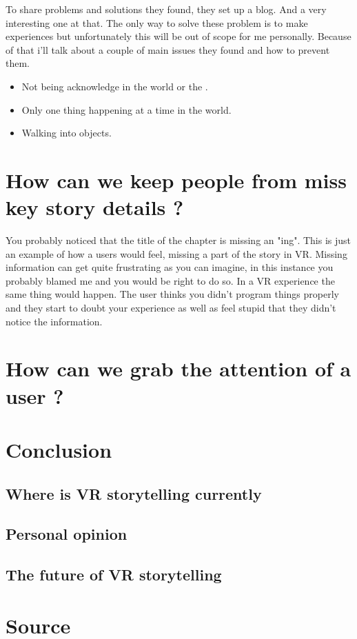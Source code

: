 \documentclass{report}
\begin{document}
				
				To share problems and solutions they found, they set up a blog. And a very interesting one at that. The only way to solve these problem is to make experiences but unfortunately this will be out of scope for me personally. Because of that i'll talk about a couple of main issues they found and how to prevent them.
				
				\begin{itemize}
					\item Not being acknowledge in the world or the .
					\item Only one thing happening at a time in the world.
					\item Walking into objects.
				\end{itemize}
				
				
				
				\chapter{How can we keep people from miss key story details ?}
				
				You probably noticed that the title of the chapter is missing an "ing". This is just an example of how a users would feel, missing a part of the story in VR. Missing information can get quite frustrating as you can imagine, in this instance you probably blamed me and you would be right to do so. In a VR experience the same thing would happen. The user thinks you didn't program things properly and they start to doubt your experience as well as feel stupid that they didn't notice the information.
				
				\chapter{How can we grab the attention of a user ?}
				
				\chapter{Conclusion}
				\section{Where is VR storytelling currently}
				\section{Personal opinion}
				\section{The future of VR storytelling}
				\chapter{Source}
		
\end{document}
